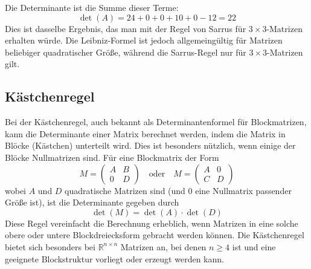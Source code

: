 Die Determinante ist die Summe dieser Terme:
\[ \det(A) = 24 + 0 + 0 + 10 + 0 - 12 = 22 \]
Dies ist dasselbe Ergebnis, das man mit der Regel von Sarrus für $3 \times
    3$-Matrizen erhalten würde. Die Leibniz-Formel ist jedoch allgemeingültig für
Matrizen beliebiger quadratischer Größe, während die Sarrus-Regel nur für $3
    \times 3$-Matrizen gilt.

\subsection{Kästchenregel}

Bei der Kästchenregel, auch bekannt als Determinantenformel für Blockmatrizen,
kann die Determinante einer Matrix berechnet werden, indem die Matrix in Blöcke
(Kästchen) unterteilt wird. Dies ist besonders nützlich, wenn einige der Blöcke
Nullmatrizen sind. Für eine Blockmatrix der Form
\[ M = \begin{pmatrix} A & B \\ 0 & D \end{pmatrix} \quad \text{oder} \quad M = \begin{pmatrix} A & 0 \\ C & D \end{pmatrix} \]
wobei $A$ und $D$ quadratische Matrizen sind (und $0$ eine Nullmatrix passender
Größe ist), ist die Determinante gegeben durch
\[ \det(M) = \det(A) \cdot \det(D) \]
Diese Regel vereinfacht die Berechnung erheblich, wenn Matrizen in eine solche
obere oder untere Blockdreiecksform gebracht werden können. Die Kästchenregel
bietet sich besonders bei $\mathbb{R}^{n \times n}$ Matrizen an, bei denen $n
    \geq 4$ ist und eine geeignete Blockstruktur vorliegt oder erzeugt werden kann.

